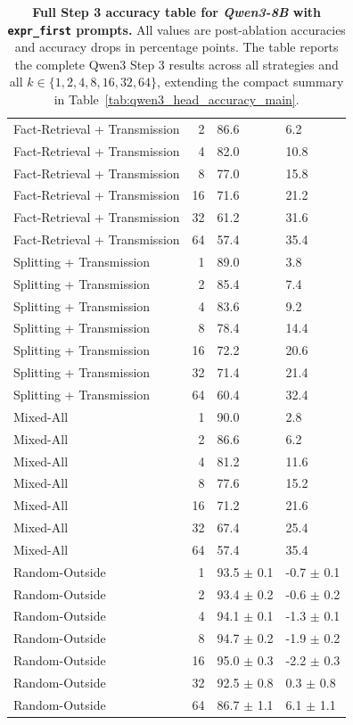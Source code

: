 \documentclass[11pt]{article}
\begin{document}
\begin{table}[p]
{\begin{tabular}{@{} l r l l @{}}
Fact-Retrieval + Transmission & 2 & 86.6 & 6.2 \\
Fact-Retrieval + Transmission & 4 & 82.0 & 10.8 \\
Fact-Retrieval + Transmission & 8 & 77.0 & 15.8 \\
Fact-Retrieval + Transmission & 16 & 71.6 & 21.2 \\
Fact-Retrieval + Transmission & 32 & 61.2 & 31.6 \\
Fact-Retrieval + Transmission & 64 & 57.4 & 35.4 \\
Splitting + Transmission & 1 & 89.0 & 3.8 \\
Splitting + Transmission & 2 & 85.4 & 7.4 \\
Splitting + Transmission & 4 & 83.6 & 9.2 \\
Splitting + Transmission & 8 & 78.4 & 14.4 \\
Splitting + Transmission & 16 & 72.2 & 20.6 \\
Splitting + Transmission & 32 & 71.4 & 21.4 \\
Splitting + Transmission & 64 & 60.4 & 32.4 \\
Mixed-All & 1 & 90.0 & 2.8 \\
Mixed-All & 2 & 86.6 & 6.2 \\
Mixed-All & 4 & 81.2 & 11.6 \\
Mixed-All & 8 & 77.6 & 15.2 \\
Mixed-All & 16 & 71.2 & 21.6 \\
Mixed-All & 32 & 67.4 & 25.4 \\
Mixed-All & 64 & 57.4 & 35.4 \\
Random-Outside & 1 & 93.5 $\pm$ 0.1 & -0.7 $\pm$ 0.1 \\
Random-Outside & 2 & 93.4 $\pm$ 0.2 & -0.6 $\pm$ 0.2 \\
Random-Outside & 4 & 94.1 $\pm$ 0.1 & -1.3 $\pm$ 0.1 \\
Random-Outside & 8 & 94.7 $\pm$ 0.2 & -1.9 $\pm$ 0.2 \\
Random-Outside & 16 & 95.0 $\pm$ 0.3 & -2.2 $\pm$ 0.3 \\
Random-Outside & 32 & 92.5 $\pm$ 0.8 & 0.3 $\pm$ 0.8 \\
Random-Outside & 64 & 86.7 $\pm$ 1.1 & 6.1 $\pm$ 1.1 \\
\bottomrule
\end{tabular}%
}
\caption{\textbf{Full Step 3 accuracy table for \textit{Qwen3-8B} with \texttt{expr\_first} prompts.} All values are post-ablation accuracies and accuracy drops in percentage points. The table reports the complete Qwen3 Step 3 results across all strategies and all $k \in \{1,2,4,8,16,32,64\}$, extending the compact summary in Table~\ref{tab:qwen3_head_accuracy_main}.}
\label{tab:qwen3_8b_ef_full_accuracy}
\end{table}
\end{document}

